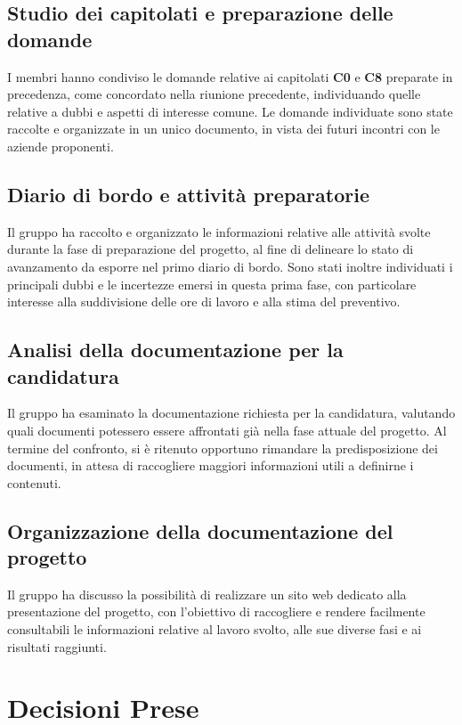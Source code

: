 \documentclass[11pt, a4paper]{article}
\begin{document}
\subsection{Studio dei capitolati e preparazione delle domande}
I membri hanno condiviso le domande relative ai capitolati \textbf{C0} e \textbf{C8} preparate in precedenza, come concordato nella riunione precedente, individuando quelle relative a dubbi e aspetti di interesse comune. Le domande individuate sono state raccolte e organizzate in un unico documento, in vista dei futuri incontri con le aziende proponenti.

\subsection{Diario di bordo e attività preparatorie}
Il gruppo ha raccolto e organizzato le informazioni relative alle attività svolte durante la fase di preparazione del progetto, al fine di delineare lo stato di avanzamento da esporre nel primo diario di bordo. Sono stati inoltre individuati i principali dubbi e le incertezze emersi in questa prima fase, con particolare interesse alla suddivisione delle ore di lavoro e alla stima del preventivo.

\subsection{Analisi della documentazione per la candidatura}
Il gruppo ha esaminato la documentazione richiesta per la candidatura, valutando quali documenti potessero essere affrontati già nella fase attuale del progetto. Al termine del confronto, si è ritenuto opportuno rimandare la predisposizione dei documenti, in attesa di raccogliere maggiori informazioni utili a definirne i contenuti.

\subsection{Organizzazione della documentazione del progetto}
Il gruppo ha discusso la possibilità di realizzare un sito web dedicato alla presentazione del progetto, con l’obiettivo di raccogliere e rendere facilmente consultabili le informazioni relative al lavoro svolto, alle sue diverse fasi e ai risultati raggiunti.

\clearpage

\section{Decisioni Prese}
\end{document}
